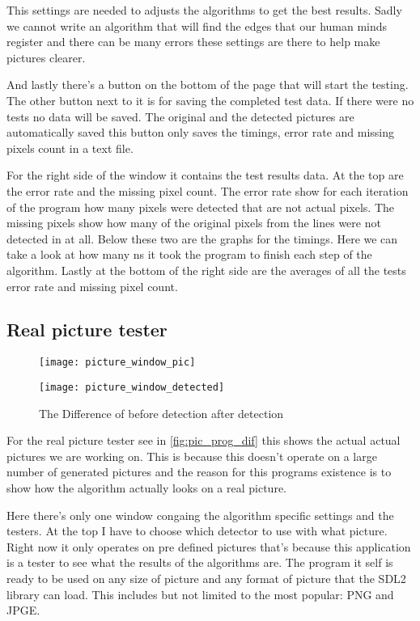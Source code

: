 This settings are needed to adjusts the algorithms to get the best results. Sadly we cannot write an algorithm that will find the edges that our human minds register and there can be many errors these settings are there to help make pictures clearer.

And lastly there's a button on the bottom of the page that will start the testing. The other button next to it is for saving the completed test data. If there were no tests no data will be saved. The original and the detected pictures are automatically saved this button only saves the timings, error rate and missing pixels count in a text file.

For the right side of the window it contains the test results data. At the top are the error rate and the missing pixel count. The error rate show for each iteration of the program how many pixels were detected that are not actual pixels. The missing pixels show how many of the original pixels from the lines were not detected in at all. Below these two are the graphs for the timings. Here we can take a look at how many \ac{ns} it took the program to finish each step of the algorithm. Lastly at the bottom of the right side are the averages of all the tests error rate and missing pixel count.

\subsection{Real picture tester}
\label{chap:real_pic_tester}

\begin{figure}[H]
\centering
\begin{minipage}[t]{.49\textwidth}
\centering
\texttt{[image: picture\_window\_pic]}
\end{minipage}
\begin{minipage}[t]{.49\textwidth}
\centering
\texttt{[image: picture\_window\_detected]}
\end{minipage}
\caption{The Difference of before detection after detection}
\label{fig:pic_prog_dif}
\end{figure}

For the real picture tester see in \autoref{fig:pic_prog_dif} this shows the actual actual pictures we are working on. This is because this doesn't operate on a large number of generated pictures and the reason for this programs existence is to show how the algorithm actually looks on a real picture.

Here there's only one window congaing the algorithm specific settings and the testers. At the top I have to choose which detector to use with what picture. Right now it only operates on pre defined pictures that's because this application is a tester to see what the results of the algorithms are. The program it self is ready to be used on any size of picture and any format of picture that the \ac{SDL2} library can load. This includes but not limited to the most popular: \ac{PNG} and \ac{JPGE}.

